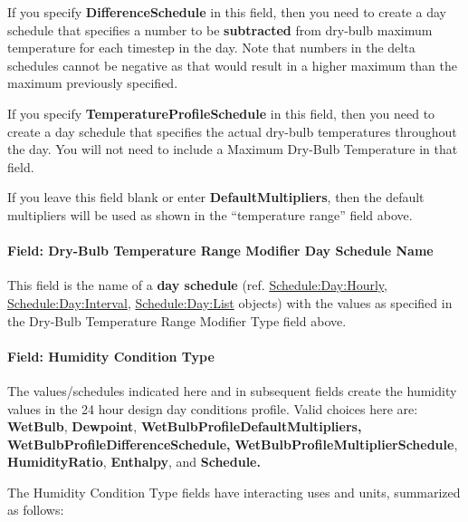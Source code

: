 If you specify \textbf{DifferenceSchedule} in this field, then you need to create a day schedule that specifies a number to be \textbf{subtracted} from dry-bulb maximum temperature for each timestep in the day. Note that numbers in the delta schedules cannot be negative as that would result in a higher maximum than the maximum previously specified.

If you specify \textbf{TemperatureProfileSchedule} in this field, then you need to create a day schedule that specifies the actual dry-bulb temperatures throughout the day. You will not need to include a Maximum Dry-Bulb Temperature in that field.

If you leave this field blank or enter \textbf{DefaultMultipliers}, then the default multipliers will be used as shown in the ``temperature range'' field above.

\paragraph{Field: Dry-Bulb Temperature Range Modifier Day Schedule Name}\label{field-dry-bulb-temperature-range-modifier-day-schedule-name}

This field is the name of a \textbf{day schedule} (ref. \hyperref[scheduledayhourly]{Schedule:Day:Hourly}, \hyperref[scheduledayinterval]{Schedule:Day:Interval}, \hyperref[scheduledaylist]{Schedule:Day:List} objects) with the values as specified in the Dry-Bulb Temperature Range Modifier Type field above.

\paragraph{Field: Humidity Condition Type}\label{field-humidity-condition-type}

The values/schedules indicated here and in subsequent fields create the humidity values in the 24 hour design day conditions profile. Valid choices here are: \textbf{WetBulb}, \textbf{Dewpoint}, \textbf{WetBulbProfileDefaultMultipliers, WetBulbProfileDifferenceSchedule,} \textbf{WetBulbProfileMultiplierSchedule}, \textbf{HumidityRatio}, \textbf{Enthalpy}, and \textbf{Schedule.}

The Humidity Condition Type fields have interacting uses and units, summarized as follows:

